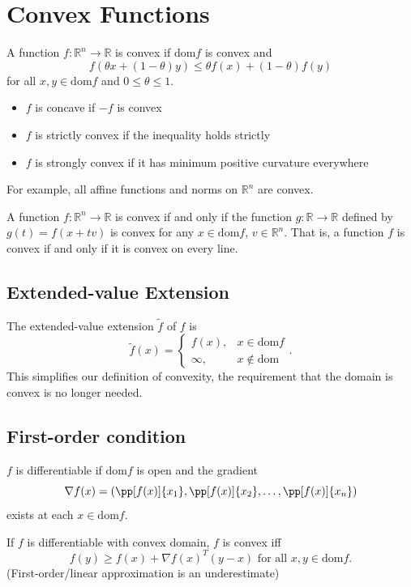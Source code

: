 \documentclass[11pt]{article}
\begin{document}
\newpage
\section{Convex Functions} 
A function $f: \mathbb{R}^n \rightarrow \mathbb{R}$ is convex if $\mathrm{dom} f$ is convex and 
\[ f(\theta x + (1 - \theta)y) \leq \theta f(x) + (1-\theta) f(y) \] 
for all $x, y \in \mathrm{dom} f$ and $0 \leq \theta \leq 1$. \par

\begin{itemize}
    \item $f$ is concave if $-f$ is convex
    \item $f$ is strictly convex if the inequality holds strictly
    \item $f$ is strongly convex if it has minimum positive curvature everywhere
\end{itemize}
For example, all affine functions and norms on $\mathbb{R}^n$ are convex. \par 

A function $f: \mathbb{R}^n \rightarrow \mathbb{R}$ is convex if and only if the function $g: \mathbb{R} \rightarrow \mathbb{R}$ defined by $g(t) = f(x+tv)$ is convex for any $x \in \mathrm{dom} f$, $v \in \mathbb{R}^n$. That is, a function $f$ is convex if and only if it is convex on every line.

\subsection{Extended-value Extension} 
The extended-value extension $\tilde{f}$ of $f$ is 
\[ \tilde{f}(x) = \begin{cases} 
    f(x), & x \in \mathrm{dom}f \\
    \infty, & x \notin \mathrm{dom}
\end{cases}. \] 
This simplifies our definition of convexity, the requirement that the domain is convex is no longer needed.

\subsection{First-order condition} 
$f$ is differentiable if $\mathrm{dom} f$ is open and the gradient 
\[ \nabla f(x) = \left( \pp[f(x)]{x_1}, \pp[f(x)]{x_2}, \ldots, \pp[f(x)]{x_n} \right) \] 
exists at each $x \in \mathrm{dom} f$. \par 
If $f$ is differentiable with convex domain, $f$ is convex iff 
\[ f(y) \geq f(x) + \nabla f(x)^T(y-x) \text{ for all } x, y \in \mathrm{dom}f. \] 
(First-order/linear approximation is an underestimate)
\end{document}
